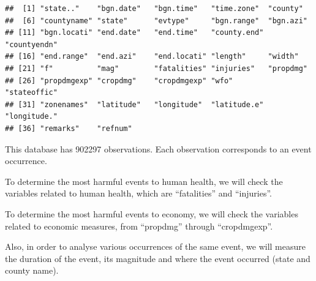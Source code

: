 \documentclass[]{article}
\newenvironment{Shaded}{\begin{snugshade}}{\end{snugshade}}
\newcommand{\KeywordTok}[1]{\textcolor[rgb]{0.13,0.29,0.53}{\textbf{{#1}}}}
\newcommand{\StringTok}[1]{\textcolor[rgb]{0.31,0.60,0.02}{{#1}}}
\newcommand{\CommentTok}[1]{\textcolor[rgb]{0.56,0.35,0.01}{\textit{{#1}}}}
\newcommand{\NormalTok}[1]{{#1}}
\begin{document}
\begin{Shaded}
\end{Shaded}

\begin{verbatim}
##  [1] "state.."    "bgn.date"   "bgn.time"   "time.zone"  "county"    
##  [6] "countyname" "state"      "evtype"     "bgn.range"  "bgn.azi"   
## [11] "bgn.locati" "end.date"   "end.time"   "county.end" "countyendn"
## [16] "end.range"  "end.azi"    "end.locati" "length"     "width"     
## [21] "f"          "mag"        "fatalities" "injuries"   "propdmg"   
## [26] "propdmgexp" "cropdmg"    "cropdmgexp" "wfo"        "stateoffic"
## [31] "zonenames"  "latitude"   "longitude"  "latitude.e" "longitude."
## [36] "remarks"    "refnum"
\end{verbatim}

This database has 902297 observations. Each observation corresponds to
an event occurrence.

To determine the most harmful events to human health, we will check the
variables related to human health, which are ``fatalities'' and
``injuries''.

To determine the most harmful events to economy, we will check the
variables related to economic measures, from ``propdmg'' through
``cropdmgexp''.

Also, in order to analyse various occurrences of the same event, we will
measure the duration of the event, its magnitude and where the event
occurred (state and county name).
\end{document}
